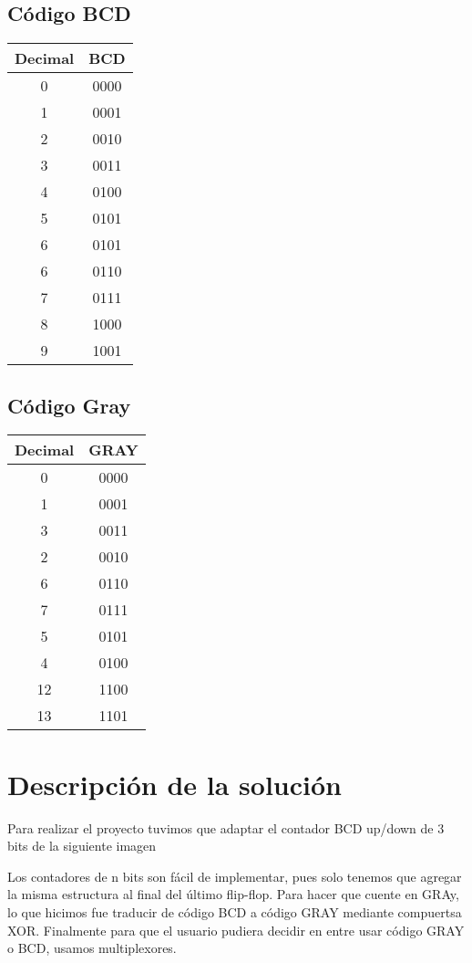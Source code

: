\documentclass{mylib/reporte}
\begin{document}
\begin{multicols}{2}



	\subsection{Código BCD}

	\begin{tabular}{c c}
	Decimal & BCD \\
	\hline
	0 & 0000 \\
	1 & 0001 \\
	2 & 0010 \\
	3 & 0011 \\
	4 & 0100 \\
	5 & 0101 \\
	6 & 0101 \\
	6 & 0110 \\
	7 & 0111 \\
	8 & 1000 \\
	9 & 1001 \\
	\end{tabular}

	\subsection{Código Gray}

	\begin{tabular}{c c}
	Decimal & GRAY \\
	\hline
	0 & 0000 \\
	1 & 0001 \\
	3 & 0011 \\
	2 & 0010 \\
	6 & 0110 \\
	7 & 0111 \\
	5 & 0101 \\
	4 & 0100 \\
	12 & 1100 \\
	13 & 1101 \\
	\end{tabular}

\end{multicols}

\section{Descripción de la solución}

Para realizar el proyecto tuvimos que adaptar el contador BCD up/down de 3 bits
de la siguiente imagen


Los contadores de n bits son fácil de implementar, pues solo tenemos que agregar
la misma estructura al final del último flip-flop.
Para hacer que cuente en GRAy, lo que hicimos fue traducir de código BCD a código GRAY
mediante compuertsa XOR. Finalmente para que el usuario pudiera decidir en entre usar
código GRAY o BCD, usamos multiplexores.
\end{document}
